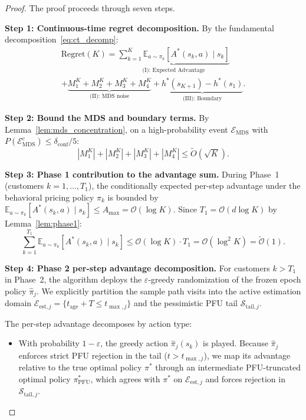 \documentclass[letterpaper, 10 pt, conference]{IEEEconf}
\newcommand{\E}{\mathbb{E}}
\newcommand{\what}[1]{\widehat{#1}}
\begin{document}
\begin{proof}
    The proof proceeds through seven steps.

    \textbf{Step 1: Continuous-time regret decomposition.}
    By the fundamental decomposition~\eqref{eq:ct_decomp}:
    \begin{multline}
        \mathrm{Regret}(K) = \underbrace{\sum_{k=1}^K \E_{a \sim \pi_k}[A^*(s_k, a) \mid s_k]}_{\text{(I): Expected Advantage}} \\
        + \underbrace{M_1^K + M_2^K + M_3^K + M_4^K}_{\text{(II): MDS noise}} + \underbrace{h^*(s_{K+1}) - h^*(s_1)}_{\text{(III): Boundary}}.
    \end{multline}

    \textbf{Step 2: Bound the MDS and boundary terms.}
    By Lemma~\ref{lem:mds_concentration}, on a high-probability event $\mathcal{E}_{\mathrm{MDS}}$ with $P(\mathcal{E}_{\mathrm{MDS}}^c) \leq \delta_{\mathrm{conf}}/5$:
    \begin{equation}
        \label{eq:mds_total}
        |M_1^K| + |M_2^K| + |M_3^K| + |M_4^K| \leq \widetilde{O}(\sqrt{K}).
    \end{equation}

    \textbf{Step 3: Phase 1 contribution to the advantage sum.}
    During Phase~1 (customers $k = 1, \ldots, T_1$), the conditionally expected per-step advantage under the behavioral pricing policy $\pi_k$ is bounded by $\E_{a \sim \pi_k}[A^*(s_k, a) \mid s_k] \leq A_{\max} = \mathcal{O}(\log K)$. Since $T_1 = \mathcal{O}(d\log K)$ by Lemma~\ref{lem:phase1}:
    \begin{equation}
        \label{eq:phase1_adv}
        \sum_{k=1}^{T_1} \E_{a \sim \pi_k}[A^*(s_k, a) \mid s_k] \leq \mathcal{O}(\log K) \cdot T_1 = \mathcal{O}(\log^2 K) = \widetilde{\mathcal{O}}(1).
    \end{equation}

    \textbf{Step 4: Phase 2 per-step advantage decomposition.}
    For customers $k > T_1$ in Phase~2, the algorithm deploys the $\varepsilon$-greedy randomization of the frozen epoch policy $\what{\pi}_j$. We explicitly partition the sample path visits into the active estimation domain $\mathcal{E}_{\mathrm{est},j} = \{t_{\mathrm{age}} + T \le t_{\max,j}\}$ and the pessimistic PFU tail $\mathcal{S}_{\mathrm{tail},j}$.

    The per-step advantage decomposes by action type:
    \begin{itemize}
        \item With probability $1 - \varepsilon$, the greedy action $\what{\pi}_j(s_k)$ is played. Because $\what{\pi}_j$ enforces strict PFU rejection in the tail ($t > t_{\max, j}$), we map its advantage relative to the true optimal policy $\pi^*$ through an intermediate PFU-truncated optimal policy $\pi^*_{\mathrm{PFU}}$, which agrees with $\pi^*$ on $\mathcal{E}_{\mathrm{est},j}$ and forces rejection in $\mathcal{S}_{\mathrm{tail},j}$.


\end{itemize}
\end{proof}
\end{document}
